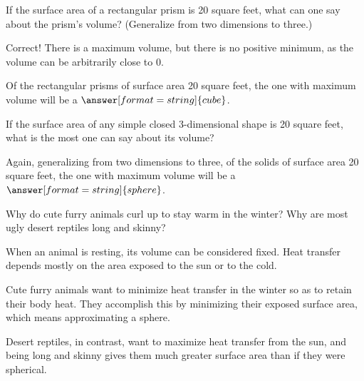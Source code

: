 \documentclass[nooutcomes]{ximera}
\begin{document}
\begin{problem}
If the surface area of a rectangular prism is 20 square feet, what can one say about the prism's volume?  (Generalize from two dimensions to three.) 

\begin{selectAll}
\end{selectAll}

\begin{problem}

Correct!  There is a maximum volume, but there is no positive minimum, as the volume can be arbitrarily close to 0.  

Of the rectangular prisms of surface area 20 square feet, the one with maximum volume will be a $\answer[format=string]{cube}$.

\begin{problem}
If the surface area of any simple closed 3-dimensional shape is 20 square feet, what is the most one can say about its volume? 

Again, generalizing from two dimensions to three, of the solids of surface area 20 square feet, the one with maximum volume will be a $\answer[format=string]{sphere}$.
\end{problem}
\end{problem}
\end{problem}

\begin{problem}
Why do cute furry animals curl up to stay warm in the winter?  Why are most ugly desert reptiles long and skinny?

\begin{freeResponse}
\end{freeResponse}
\begin{hint}
When an animal is resting, its volume can be considered fixed.  Heat transfer depends mostly on the area exposed to the sun or to the cold.  

Cute furry animals want to minimize heat transfer in the winter so as to retain their body heat.  They accomplish this by minimizing their exposed surface area, which means approximating a sphere. 

Desert reptiles, in contrast, want to maximize heat transfer from the sun, and being long and skinny gives them much greater surface area than if they were spherical.  
\end{hint}
\end{problem}
\end{document}
